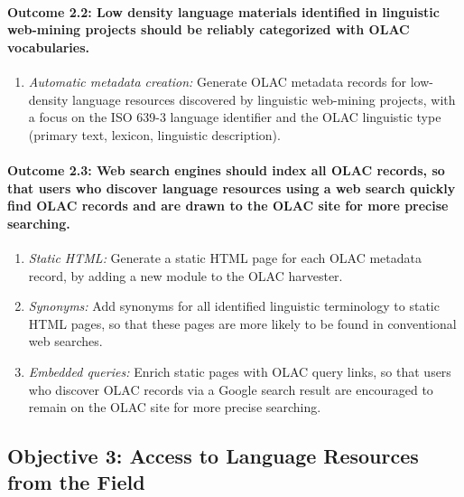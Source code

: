 
\def\task{2.2}
\paragraph{Outcome {\task}: Low density language materials identified in
  linguistic web-mining projects should be reliably categorized with OLAC vocabularies.}

\begin{enumerate}[label=\emph{\task\alph*}]
\item \emph{Automatic metadata creation:}
  Generate OLAC metadata records for low-density
  language resources discovered by linguistic web-mining projects,
  with a focus on the ISO 639-3 language identifier and the OLAC
  linguistic type (primary text, lexicon, linguistic description).
\end{enumerate}


\def\task{2.3}
\paragraph{Outcome {\task}: Web search engines should index all OLAC records,
      so that users who discover language resources using a web search
      quickly find OLAC records and are drawn to the OLAC site for
      more precise searching.}

\begin{enumerate}[label=\emph{\task\alph*}]
\item \emph{Static HTML:}
  Generate a static HTML page for each OLAC metadata record, by adding
  a new module to the OLAC harvester.
\item \emph{Synonyms:}
  Add synonyms for all identified linguistic terminology to static HTML pages,
  so that these pages are more likely to be found in conventional web searches.
\item \emph{Embedded queries:}
  Enrich static pages with OLAC query links, so that users who discover
  OLAC records via a Google search result are encouraged to remain on the
  OLAC site for more precise searching.
\end{enumerate}

\subsection*{Objective 3: Access to Language Resources from the Field}

